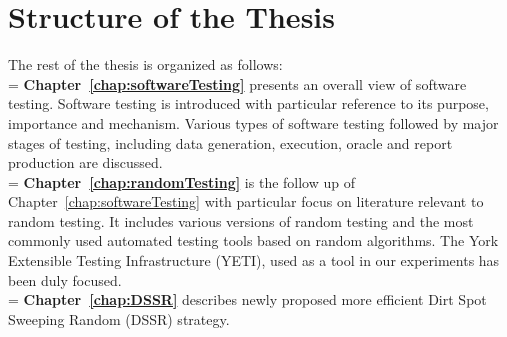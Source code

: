 %



\section{Structure of the Thesis}
The rest of the thesis is organized as follows:\\

\hangindent=\parindent
{}
\noindent
\textbf{Chapter~\ref{chap:softwareTesting}} presents an overall view of software testing. Software testing is introduced with particular reference to its purpose, importance and mechanism. Various types of software testing followed by major stages of testing, including data generation, execution, oracle and report production are discussed. \\


\hangindent=\parindent
{}
\noindent
\textbf{Chapter~\ref{chap:randomTesting}} is the follow up of Chapter~\ref{chap:softwareTesting} with particular focus on literature relevant to random testing. It includes various versions of random testing and the most commonly used automated testing tools based on random algorithms. The York Extensible Testing Infrastructure (YETI), used as a tool in our experiments has been duly focused.\\

\hangindent=\parindent
{}
\noindent
\textbf{Chapter~\ref{chap:DSSR}} describes newly proposed more efficient Dirt Spot Sweeping Random (DSSR) strategy. \\

